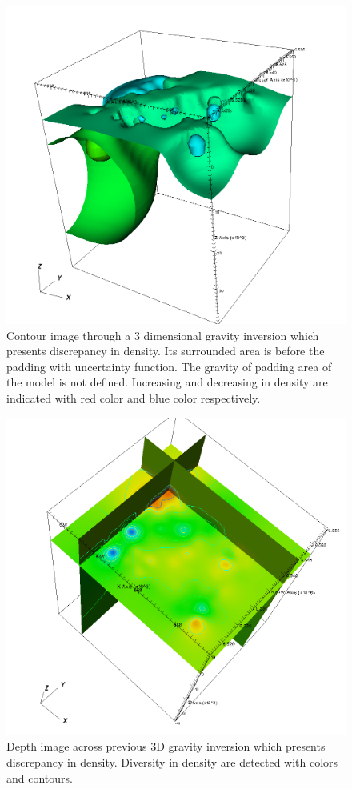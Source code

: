 \begin{figure}
\centering
\includegraphics[width=\textwidth]{density1.png}
\caption{Contour image through a 3 dimensional gravity inversion which presents discrepancy in density. Its surrounded area is before the padding with uncertainty function. The gravity of padding area of the
model is not defined. Increasing and decreasing in density are indicated with red color and blue color respectively.}
\end{figure}

\begin{figure}
\centering
\includegraphics[width=\textwidth]{density2.png}
\caption{Depth image across previous 3D gravity inversion which presents discrepancy in density. Diversity in density are detected with colors and contours.}
\end{figure}

